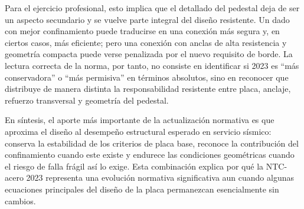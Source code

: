 Para el ejercicio profesional, esto implica que el detallado del pedestal deja de ser un aspecto
secundario y se vuelve parte integral del diseño resistente. Un dado con mejor confinamiento puede
traducirse en una conexión más segura y, en ciertos casos, más eficiente; pero una conexión con
anclas de alta resistencia y geometría compacta puede verse penalizada por el nuevo requisito de
borde. La lectura correcta de la norma, por tanto, no consiste en identificar si 2023 es “más
conservadora” o “más permisiva” en términos absolutos, sino en reconocer que distribuye de manera
distinta la responsabilidad resistente entre placa, anclaje, refuerzo transversal y geometría del
pedestal.

En síntesis, el aporte más importante de la actualización normativa es que aproxima el diseño al
desempeño estructural esperado en servicio sísmico: conserva la estabilidad de los criterios de
placa base, reconoce la contribución del confinamiento cuando este existe y endurece las condiciones
geométricas cuando el riesgo de falla frágil así lo exige. Esta combinación explica por qué la
NTC-acero 2023 representa una evolución normativa significativa aun cuando algunas ecuaciones
principales del diseño de la placa permanezcan esencialmente sin cambios.

